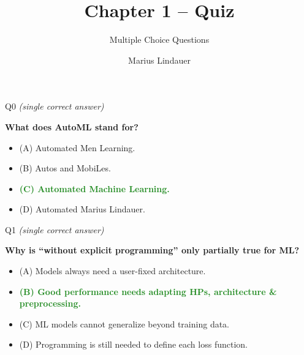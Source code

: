 \documentclass[main]{subfiles}
\title[AutoML: Introduction]{Chapter 1 -- Quiz}
\subtitle{Multiple Choice Questions}
\author[Marius Lindauer]{Marius Lindauer}
\date{}
\newcommand{\correct}[1]{\textcolor{ForestGreen}{\textbf{#1} \checkmark}}
\newcommand{\wrong}[1]{#1}
\begin{document}
    \maketitle


\begin{frame}{Q0 \hfill \small\normalfont\textit{(single correct answer)}}

\textbf{What does AutoML stand for?}

\begin{itemize}
    \item \wrong{(A) \; Automated Men Learning.}
    \item \wrong{(B) \; Autos and MobiLes.}
    \item \correct{(C) \; Automated Machine Learning.}
    \item \wrong{(D) \; Automated Marius Lindauer.}
\end{itemize}

\end{frame}
\begin{frame}{Q1 \hfill \small\normalfont\textit{(single correct answer)}}

\textbf{Why is ``without explicit programming'' only partially true for ML?}

\begin{itemize}
    \item \wrong{(A) \; Models always need a user-fixed architecture.}
    \item \correct{(B) \; Good performance needs adapting HPs, architecture \& preprocessing.}
    \item \wrong{(C) \; ML models cannot generalize beyond training data.}
    \item \wrong{(D) \; Programming is still needed to define each loss function.}
\end{itemize}

\end{frame}
\end{document}
